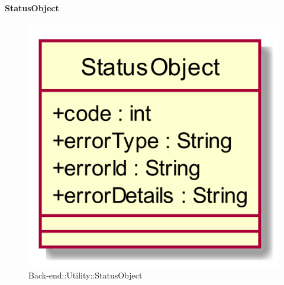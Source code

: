 \hypertarget{StatusObject_label}{\paragraph{StatusObject}}
\begin{figure}[h]
	\centering
	\includegraphics[width=\textwidth,height=\textheight,keepaspectratio]{images/ClassStatusObject.png}
	\caption{Back-end::Utility::StatusObject}
\end{figure}

